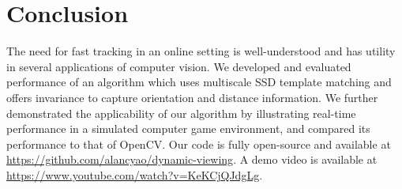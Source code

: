 \documentclass[10pt,twocolumn,letterpaper]{article}
\begin{document}
\section*{Conclusion}
The need for fast tracking in an online setting is well-understood and has utility
in several applications of computer vision. We developed and evaluated performance
of an algorithm which uses multiscale SSD template matching and offers invariance to
capture orientation and distance information. We further demonstrated the applicability of our
algorithm by illustrating real-time performance in a simulated computer game environment,
and compared its performance to that of OpenCV. Our code is fully open-source and available
at \url{https://github.com/alancyao/dynamic-viewing}. A demo video is available at
\url{https://www.youtube.com/watch?v=KeKCjQJdgLg}.

{\small


}
\end{document}
